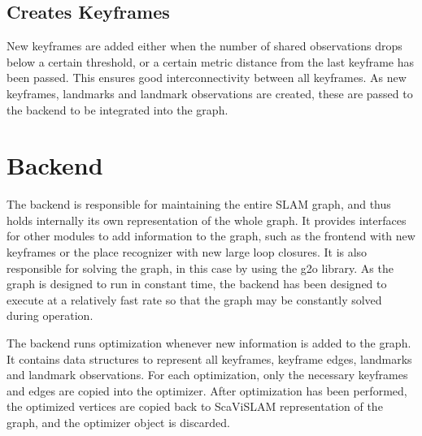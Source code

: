 \subsection{Creates Keyframes}

New keyframes are added either when the number of shared observations drops below a certain threshold, or a certain metric distance from the last keyframe has been passed.  This ensures good interconnectivity between all keyframes.  As new keyframes, landmarks and landmark observations are created, these are passed to the backend to be integrated into the graph.

\section{Backend}
\label{sec:scavislam_backend}

The backend is responsible for maintaining the entire SLAM graph, and thus holds internally its own representation of the whole graph.  It provides interfaces for other modules to add information to the graph, such as the frontend with new keyframes or the place recognizer with new large loop closures. It is also responsible for solving the graph, in this case by using the g2o library\cite{g2o}. As the graph is designed to run in constant time, the backend has been designed to execute at a relatively fast rate so that the graph may be constantly solved during operation.


The backend runs optimization whenever new information is added to the graph.  It contains data structures to represent all keyframes, keyframe edges, landmarks and landmark observations.  For each optimization, only the necessary keyframes and edges are copied into the optimizer.  After optimization has been performed, the optimized vertices are copied back to ScaViSLAM representation of the graph, and the optimizer object is discarded.

